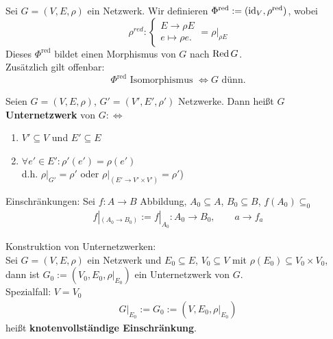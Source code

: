 \begin{bemerkungnr}\enter
    Sei $G = (V, E, \rho)$ ein Netzwerk.
    Wir definieren $ \Phi^{\text{red}} := (\operatorname{id}_V, \rho^{\text{red}})$, wobei
    $$ \rho^{red} : \begin{cases}
        E \to \rho E\\ 
        e\mapsto \rho e.\end{cases} = \rho|_{\rho E}$$
    Dieses $ \Phi^{\text{red}} $ bildet einen Morphismus von $G$ nach $\operatorname{Red} G$.\\
    Zusätzlich gilt offenbar:
    $$ \Phi^{\text{red}} \text{ Isomorphismus } \iff G \text{ dünn}.$$
\end{bemerkungnr}

\begin{definition}
    Seien $G=(V,E,\rho)$, $G'=(V',E',\rho')$ Netzwerke. Dann heißt $G$ \textbf{Unternetzwerk} von $G:\Longleftrightarrow$
    \begin{enumerate}
        \item $V'\subseteq V$ und $E'\subseteq E$
        \item $\forall e'\in E':\rho'(e')=\rho(e')$\\
        d.h. $\rho|_{G'}=\rho'$ oder $\rho|_{(E'\to V'\times V')}=\rho'$)
    \end{enumerate}
\end{definition}

\begin{notation}
    Einschränkungen: Sei $f:A\to B$ Abbildung, $A_0\subseteq A$, $B_0\subseteq B$, $f(A_0)\subseteq_0$
    \begin{align*}
        f|_{(A_0\to B_0)}:=f|_{A_0}:A_0\to B_0,\qquad a\to f_a
    \end{align*}
\end{notation}

Konstruktion von Unternetzwerken:\\
Sei $G=(V,E,\rho)$ ein Netzwerk und $E_0\subseteq E$, $V_0\subseteq V$ mit $\rho(E_0)\subseteq V_0\times V_0$, dann ist $G_0:=(V_0,E_0,\rho|_{E_0})$ ein Unternetzwerk von $G$.\\
Spezialfall: $V=V_0$
\begin{align*}
    G|_{E_0}:=G_0:=(V,E_0,\rho|_{E_0})
\end{align*}
heißt \textbf{knotenvollständige Einschränkung}.


